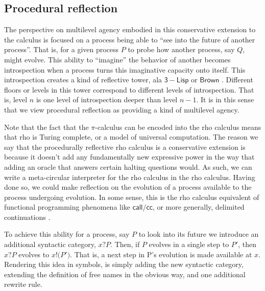 \subsection{Procedural reflection}

The perspective on multilevel agency embodied in this conservative
extension to the calculus is focused on a process being able to ``see
into the future of another process''. That is, for a given process $P$
to probe how another process, say $Q$, might evolve. This ability to
``imagine'' the behavior of another becomes introspection when a
process turns this imaginative capacity onto itself. This
introspection creates a kind of reflective tower, ala
$\mathsf{3-Lisp}$ \cite{DBLP:conf/popl/Smith84} or $\mathsf{Brown}$
\cite{DBLP:journals/lisp/WandF88}. Different floors or levels in this
tower correspond to different levels of introspection. That is, level
$n$ is one level of introspection deeper than level $n-1$. It is in
this sense that we view procedural reflection as providing a kind of
multilevel agency.

Note that the fact that the $\pi$-calculus can be encoded into the rho
calculus means that rho is Turing complete, or a model of universal
computation. The reason we say that the procedurally reflective rho
calculus is a conservative extension is because it doesn't add any
fundamentally new expressive power in the way that adding an oracle
that answers certain halting questions would. As such, we can write a
meta-circular interpreter for the rho calculus in the rho
calculus. Having done so, we could make reflection on the evolution of
a process available to the process undergoing evolution. In some
sense, this is the rho calculus equivalent of functional programming
phenomena like $\mathsf{call/cc}$, or more generally, delimited
continuations \cite{DBLP:journals/jfp/DybvigJS07}.

To achieve this ability for a process, say $P$ to look into its future
we introduce an additional syntactic category, $x\mathsf{?}P$. Then, if
$P$ evolves in a single step to $P'$, then $x\mathsf{?}P$ evolves to
$x\mathsf{!}\mathsf{(}P'\mathsf{)}$. That is, a next step in P's
evolution is made available at $x$. Rendering this idea in symbols, is
simply adding the new syntactic category, extending the definition of
free names in the obvious way, and one additional rewrite rule.


